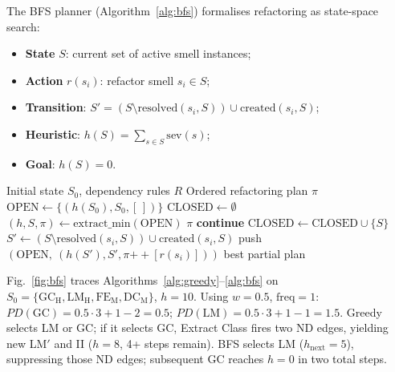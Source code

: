 \documentclass[conference]{IEEEtran}
\begin{document}
The BFS planner (Algorithm~\ref{alg:bfs}) formalises refactoring as state-space search:
\begin{itemize}
  \item \textbf{State} $S$: current set of active smell instances;
  \item \textbf{Action} $r(s_i)$: refactor smell $s_i \in S$;
  \item \textbf{Transition}:
        $S' = (S \setminus \mathrm{resolved}(s_i, S))
               \cup \mathrm{created}(s_i, S)$;
  \item \textbf{Heuristic}: $h(S) = \sum_{s \in S} \mathrm{sev}(s)$;
  \item \textbf{Goal}: $h(S) = 0$.
\end{itemize}

\begin{algorithm}[tb]
\caption{BFS refactoring planner}
\label{alg:bfs}
\begin{algorithmic}[1]
\REQUIRE Initial state $S_0$, dependency rules $R$
\ENSURE Ordered refactoring plan $\pi$
\STATE $\text{OPEN} \leftarrow \{(h(S_0), S_0, [\,])\}$
\STATE $\text{CLOSED} \leftarrow \emptyset$
  \STATE $(h, S, \pi) \leftarrow \text{extract\_min}(\text{OPEN})$
   \RETURN $\pi$ \ENDIF
   \STATE \textbf{continue} \ENDIF
  \STATE $\text{CLOSED} \leftarrow \text{CLOSED} \cup \{S\}$
    \STATE $S' \leftarrow (S \setminus \mathrm{resolved}(s_i,S))
                          \cup \mathrm{created}(s_i,S)$
      \STATE push$(\text{OPEN},\ (h(S'), S', \pi{+\!\!+}[r(s_i)]))$
    \ENDIF
  \ENDFOR
\ENDWHILE
\RETURN best partial plan
\end{algorithmic}
\end{algorithm}

Fig.~\ref{fig:bfs} traces Algorithms~\ref{alg:greedy}--\ref{alg:bfs} on
$S_0 = \{\mathrm{GC_H}, \mathrm{LM_H}, \mathrm{FE_M}, \mathrm{DC_M}\}$, $h{=}10$.
Using $w{=}0.5$, $\mathrm{freq}{=}1$:
$PD(\mathrm{GC}){=}0.5{\cdot}3{+}1{-}2{=}0.5$;
$PD(\mathrm{LM}){=}0.5{\cdot}3{+}1{-}1{=}1.5$.
Greedy selects LM or GC; if it selects GC, Extract Class fires two ND edges,
yielding new LM$'$ and II ($h{=}8$, 4+ steps remain).
BFS selects LM ($h_{\text{next}}{=}5$), suppressing those ND edges;
subsequent GC reaches $h{=}0$ in two total steps.
\end{document}
